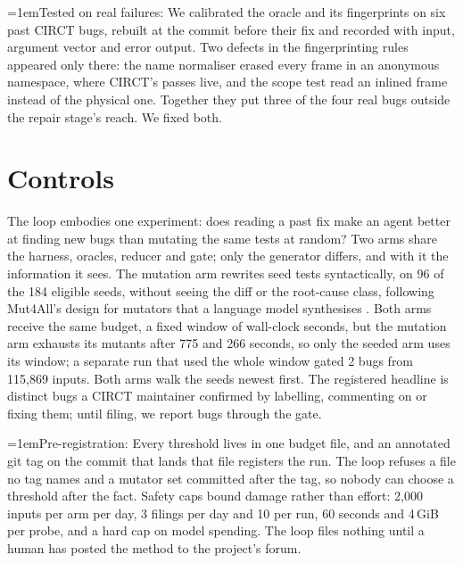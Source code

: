 \documentclass[conference]{IEEEtran}
\newcommand{\pointhead}[1]{\par\noindent\hangindent=1em\hangafter=1\makebox[1em][l]{\textbullet}#1:}
\begin{document}
\pointhead{Tested on real failures} We calibrated the oracle and its fingerprints
on six past CIRCT bugs, rebuilt at the commit before their fix and recorded with
input, argument vector and error output. %
Two defects in the fingerprinting rules appeared only there: the name normaliser
erased every frame in an anonymous namespace, where CIRCT's passes live, and
the scope test read an inlined frame instead of the physical one. Together they
put three of the four real bugs outside the repair stage's reach. We fixed both. %

\section{Controls}\label{sec:eval}
The loop embodies one experiment: does reading a past fix make an agent better
at finding new bugs than mutating the same tests at random? Two arms share the
harness, oracles, reducer and gate; only the generator differs, and with it the
information it sees. The mutation arm rewrites seed tests syntactically, on 96
of the 184 eligible seeds, without seeing the diff or the root-cause class, following Mut4All's design for mutators that a language model
synthesises \cite{mut4all}.
Both arms receive the same budget, a fixed window of wall-clock seconds, but
the mutation arm exhausts its mutants after 775 and 266 seconds, so only the
seeded arm uses its window; a separate run that used the whole window gated 2
bugs from 115,869 inputs. Both arms walk the seeds newest first. The registered headline is distinct bugs a CIRCT
maintainer confirmed by labelling, commenting on or fixing them; until filing,
we report bugs through the gate.

\pointhead{Pre-registration} Every threshold lives in one budget file, and an
annotated git tag on the commit that lands that file registers the run. The
loop refuses a file no tag names and a mutator set committed after the tag, so
nobody can choose a threshold after the fact. %
Safety caps bound damage rather than effort: 2,000 inputs per arm per day, 3
filings per day and 10 per run, 60 seconds and 4\,GiB per probe, and a hard cap
on model spending. %
The loop files nothing until a human has posted the method to the project's
forum. %
\end{document}
